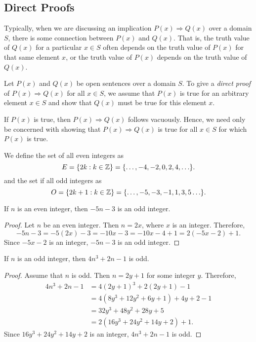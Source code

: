 \subsection{Direct Proofs}
Typically, when we are discussing an implication $P(x) \Rightarrow Q(x)$ over a
domain $S$, there is some connection between $P(x)$ and $Q(x)$. That is, the truth
value of $Q(x)$ for a particular $x \in S$ often depends on the truth value of $P(x)$
for that same element $x$, or the truth value of $P(x)$ depends on the truth value
of $Q(x)$.
\begin{defi}
    Let $P(x)$ and $Q(x)$ be open sentences over a domain $S$. To give a
    \emph{direct proof} of $P(x) \Rightarrow Q(x)$ for all $x \in S$, we assume
    that $P(x)$ is true for an arbitrary element $x \in S$ and show that $Q(x)$
    must be true for this element $x$.
\end{defi}
If $P(x)$ is true, then $P(x) \Rightarrow Q(x)$ follows vacuously. Hence, we need
only be concerned with showing that $P(x) \Rightarrow Q(x)$ is true for all $x
\in S$ for which $P(x)$ is true.

We define the set of all even integers as
\begin{equation*}
    E = \{ 2k : k \in \mathbb{Z}\} = \{\ldots,-4,-2,0,2,4,\ldots \}.
\end{equation*}
and the set if all odd integers as
\begin{equation*}
    O = \{ 2k+1 : k \in \mathbb{Z}\} = \{\ldots,-5,-3,-1,1,3,5\ldots \}.
\end{equation*}
\begin{eg}
    If $n$ is an even integer, then $-5n-3$ is an odd integer.  
    \begin{proof}
         Let $n$ be an even integer. Then $n=2x$, where $x$ is an integer. Therefore,
         \begin{equation*}
                   -5n-3 = -5(2x)-3=-10x-3=-10x-4+1=2(-5x-2)+1.
         \end{equation*} 
         Since $-5x-2$ is an integer, $-5n-3$ is an odd integer.
    \end{proof}
\end{eg}

\begin{eg}
    If $n$ is an odd integer, then $4n^3+2n-1$ is odd.
    \begin{proof}
         Assume that $n$ is odd. Then $n=2y+1$ for some integer $y$. Therefore,
         \begin{align*}
             4n^3+2n-1  &= 4(2y+1)^3+2(2y+1)-1 \\
             &= 4(8y^3+12y^2+6y+1)+4y+2-1 \\
             &= 32y^3+48y^2+28y+5 \\
             &= 2(16y^3+24y^2+14y+2)+1.
         \end{align*}
         Since  $16y^3+24y^2+14y+2$ is an integer, $4n^3+2n-1$ is odd.
    \end{proof}
\end{eg}

